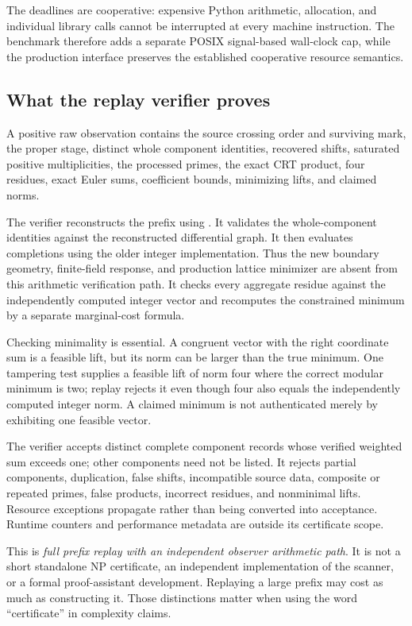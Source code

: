 The deadlines are cooperative: expensive Python arithmetic, allocation, and
individual library calls cannot be interrupted at every machine instruction.
The benchmark therefore adds a separate POSIX signal-based wall-clock cap, while the production
interface preserves the established cooperative resource semantics.

\subsection{What the replay verifier proves}

A positive raw observation contains the source crossing order and surviving
mark, the proper stage, distinct whole component identities, recovered shifts,
saturated positive multiplicities, the processed primes, the exact CRT product,
four residues, exact Euler sums, coefficient bounds, minimizing lifts, and
claimed norms.

The verifier reconstructs the prefix using .
It validates the whole-component identities against the reconstructed
differential graph. It then evaluates completions using the older
 integer implementation. Thus the new boundary geometry,
finite-field response, and production lattice minimizer are absent from this
arithmetic verification path. It checks every aggregate residue against the
independently computed integer vector and recomputes the constrained minimum
by a separate marginal-cost formula.

Checking minimality is essential. A congruent vector with the right coordinate
sum is a feasible lift, but its norm can be larger than the true minimum.
One tampering test supplies a feasible lift of norm four where the correct
modular minimum is two; replay rejects it even though four also equals the
independently computed integer norm. A claimed minimum is not authenticated
merely by exhibiting one feasible vector.

The verifier accepts distinct complete component records whose verified weighted
sum exceeds one; other components need not be listed. It rejects partial
components, duplication, false shifts, incompatible source data, composite or
repeated primes, false products, incorrect residues, and nonminimal lifts.
Resource exceptions propagate rather than being converted into acceptance.
Runtime counters and performance metadata are outside its certificate scope.

This is \emph{full prefix replay with an independent observer arithmetic path}.
It is not a short standalone NP certificate, an independent implementation of
the scanner, or a formal proof-assistant development. Replaying a large prefix
may cost as much as constructing it. Those distinctions matter when using the
word ``certificate'' in complexity claims.

